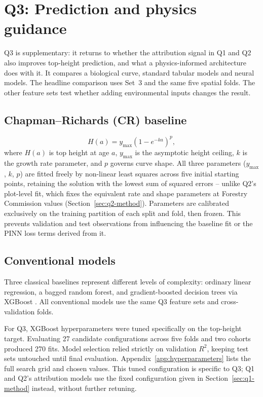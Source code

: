\documentclass[logo,msc,ai]{infthesis}           %
\begin{document}
\section{Q3: Prediction and physics guidance}
\label{sec:rq1-method}
\label{sec:q3-method}

Q3 is supplementary: it returns to whether the attribution signal in Q1 and Q2 also
improves top-height prediction, and what a physics-informed architecture does with it.
It compares a biological curve, standard tabular models and neural models. The headline
comparison uses Set~3 and the same five spatial folds. The other feature sets test whether adding
environmental inputs changes the result.

\subsection{Chapman--Richards (CR) baseline}
\begin{equation}
H(a) = y_{\max}\left(1 - e^{-ka}\right)^p,
\label{eq:cr}
\end{equation}
where $H(a)$ is top height at age $a$, $y_{\max}$ is the asymptotic height ceiling, $k$ is the growth rate parameter, and $p$ governs curve shape. All three parameters ($y_{\max}$, $k$, $p$) are fitted freely by non-linear least squares across five initial starting points, retaining the solution with the lowest sum of squared errors -- unlike Q2's plot-level fit, which fixes the equivalent rate and shape parameters at Forestry Commission values (Section~\ref{sec:q2-method}). Parameters are calibrated exclusively on the training partition of each split and fold, then frozen. This prevents validation and test observations from influencing the baseline fit or the PINN loss terms derived from it.

\subsection*{Conventional models}
Three classical baselines represent different levels of complexity: ordinary linear regression, a bagged random forest, and gradient-boosted decision trees via XGBoost \cite{chen2016XGBoost_C4_NN}. All conventional models use the same Q3 feature sets and cross-validation folds.

For Q3, XGBoost hyperparameters were tuned specifically on the top-height target. Evaluating 27 candidate configurations across five folds and two cohorts produced 270 fits. Model selection relied strictly on validation $R^2$, keeping test sets untouched until final evaluation. Appendix~\ref{app:hyperparameters} lists the full search grid and chosen values. This tuned configuration is specific to Q3; Q1 and Q2's attribution models use the fixed configuration given in Section~\ref{sec:q1-method} instead, without further retuning.
\end{document}
